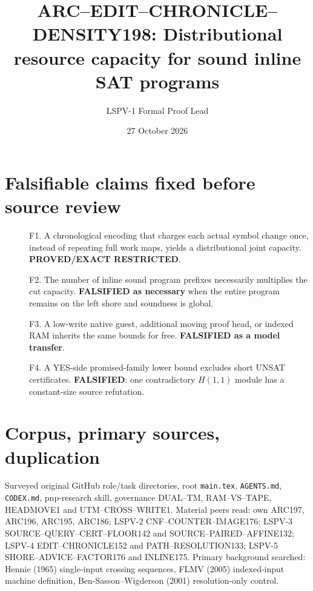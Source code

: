 \documentclass[11pt]{article}
\title{ARC--EDIT--CHRONICLE--DENSITY198: Distributional resource capacity for sound inline SAT programs}
\author{LSPV-1 Formal Proof Lead}
\date{27 October 2026}
\begin{document}
\maketitle
\begin{center}\end{center}

\section{Falsifiable claims fixed before source review}
\begin{description}
\item[] F1. A chronological encoding that charges each actual symbol change once, instead of repeating full work maps, yields a distributional joint capacity. \textbf{PROVED/EXACT RESTRICTED}.
\item[] F2. The number of inline sound program prefixes necessarily multiplies the cut capacity. \textbf{FALSIFIED as necessary} when the entire program remains on the left shore and soundness is global.
\item[] F3. A low-write native guest, additional moving proof head, or indexed RAM inherits the same bounds for free. \textbf{FALSIFIED as a model transfer}.
\item[] F4. A YES-side promised-family lower bound excludes short UNSAT certificates. \textbf{FALSIFIED}: one contradictory $H(1,1)$ module has a constant-size source refutation.
\end{description}

\section{Corpus, primary sources, duplication}
Surveyed original GitHub role/task directories, root \texttt{main.tex}, \texttt{AGENTS.md}, \texttt{CODEX.md}, pnp-research skill, governance DUAL--TM, RAM--VS--TAPE, HEADMOVE1 and UTM--CROSS--WRITE1. Material peers read: own ARC197, ARC196, ARC195, ARC186; LSPV-2 CNF--COUNTER--IMAGE176; LSPV-3 SOURCE--QUERY--CERT--FLOOR142 and SOURCE--PAIRED--AFFINE132; LSPV-4 EDIT--CHRONICLE152 and PATH--RESOLUTION133; LSPV-5 SHORE--ADVICE--FACTOR176 and INLINE175. Primary background searched: Hennie (1965) single-input crossing sequences, FLMV (2005) indexed-input machine definition, Ben-Sasson--Wigderson (2001) resolution-only control.
\end{document}

